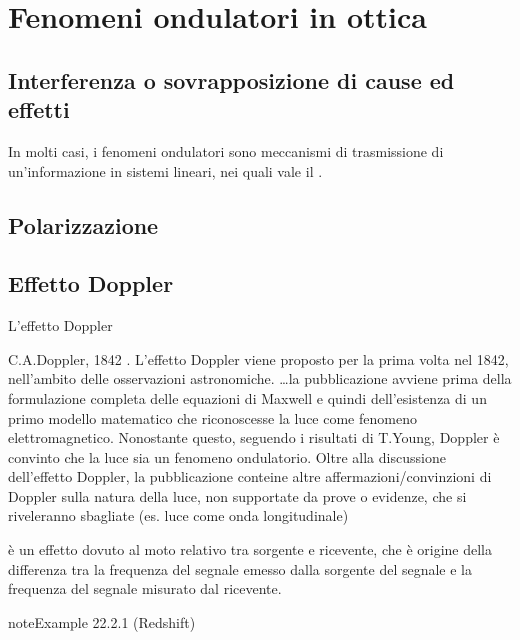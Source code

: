 \documentclass[letterpaper,10pt,italian]{jupyterBook}
\begin{document}
\sphinxstepscope


\section{Fenomeni ondulatori in ottica}
\label{\detokenize{ch/waves/optics-phenomena:fenomeni-ondulatori-in-ottica}}\label{\detokenize{ch/waves/optics-phenomena:physics-hs-waves-optics-geometric-phenomena}}\label{\detokenize{ch/waves/optics-phenomena::doc}}

\subsection{Interferenza \sphinxhyphen{} o sovrapposizione di cause ed effetti}
\label{\detokenize{ch/waves/optics-phenomena:interferenza-o-sovrapposizione-di-cause-ed-effetti}}
\sphinxAtStartPar
In molti casi, i fenomeni ondulatori sono meccanismi di trasmissione di un’informazione in sistemi lineari, nei quali vale il .


\subsection{Polarizzazione}
\label{\detokenize{ch/waves/optics-phenomena:polarizzazione}}

\subsection{Effetto Doppler}
\label{\detokenize{ch/waves/optics-phenomena:effetto-doppler}}
\sphinxAtStartPar
L’effetto Doppler%
\begin{footnote}[1]\sphinxAtStartFootnote
C.A.Doppler, 1842 . L’effetto Doppler viene proposto per la prima volta nel 1842, nell’ambito delle osservazioni astronomiche. …la pubblicazione avviene prima della formulazione completa delle equazioni di Maxwell e quindi dell’esistenza di un primo modello matematico che riconoscesse la luce come fenomeno elettromagnetico. Nonostante questo, seguendo i risultati di T.Young, Doppler è convinto che la luce sia un fenomeno ondulatorio. Oltre alla discussione dell’effetto Doppler, la pubblicazione conteine altre affermazioni/convinzioni di Doppler sulla natura della luce, non supportate da prove o evidenze, che si riveleranno sbagliate (es. luce come onda longitudinale)
%
\end{footnote} è un effetto dovuto al moto relativo tra sorgente e ricevente, che è origine della differenza tra la frequenza del segnale emesso dalla sorgente del segnale e la frequenza del segnale misurato dal ricevente.
\label{ch/waves/optics-phenomena:example-0}
\begin{sphinxadmonition}{note}{Example 22.2.1 (Red\sphinxhyphen{}shift)}


\end{sphinxadmonition}
\end{document}
